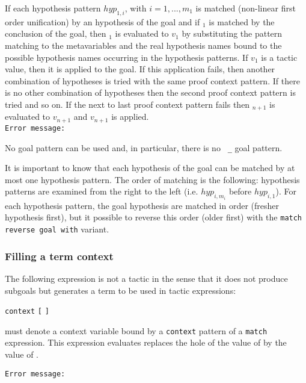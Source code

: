 
If each hypothesis pattern $hyp_{1,i}$, with $i=1,...,m_1$
is matched (non-linear first order unification) by an hypothesis of
the goal and if {\pattern}$_1$ is matched by the conclusion of the
goal, then {\tacexpr}$_1$ is evaluated to $v_1$ by substituting the
pattern matching to the metavariables and the real hypothesis names
bound to the possible hypothesis names occurring in the hypothesis
patterns. If $v_1$ is a tactic value, then it is applied to the
goal. If this application fails, then another combination of
hypotheses is tried with the same proof context pattern. If there is
no other combination of hypotheses then the second proof context
pattern is tried and so on. If the next to last proof context pattern
fails then {\tacexpr}$_{n+1}$ is evaluated to $v_{n+1}$ and $v_{n+1}$
is applied.\\

{\tt Error message:}\\


No goal pattern can be used and, in particular, there is no {\tt
\_} goal pattern.

It is important to know that each hypothesis of the goal can be
matched by at most one hypothesis pattern. The order of matching is
the following: hypothesis patterns are examined from the right to the
left (i.e. $hyp_{i,m_i}$ before $hyp_{i,1}$). For each hypothesis
pattern, the goal hypothesis are matched in order (fresher hypothesis
first), but it possible to reverse this order (older first) with
the {\tt match reverse goal with} variant.

\subsubsection{Filling a term context}

The following expression is not a tactic in the sense that it does not
produce subgoals but generates a term to be used in tactic
expressions:

{\tt context} {\ident} {\tt [} {\tacexpr} {\tt ]}

{\ident} must denote a context variable bound by a {\tt context}
pattern of a {\tt match} expression. This expression evaluates
replaces the hole of the value of {\ident} by the value of
{\tacexpr}.

{\tt Error message:}\\

